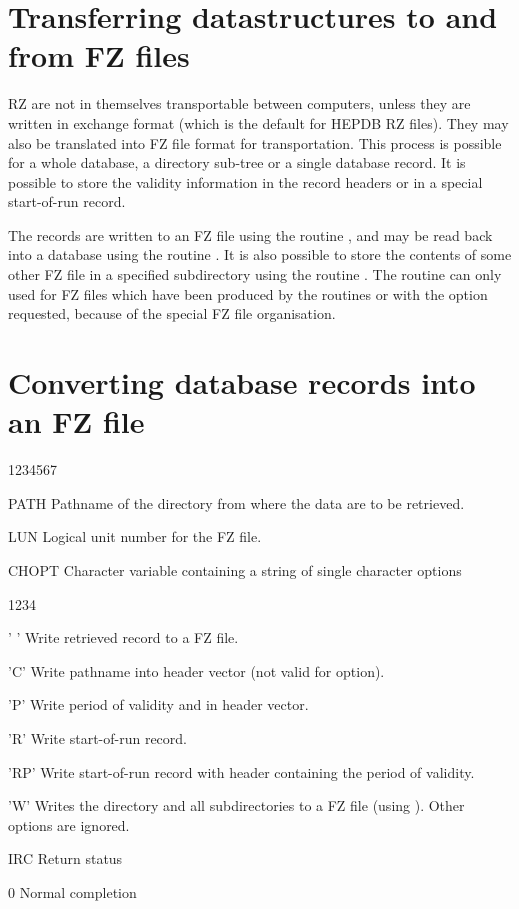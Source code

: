 \section{Transferring datastructures to and from FZ files}

RZ are not in themselves transportable between computers, unless
they are written in exchange format (which is the default for
HEPDB RZ files).
They may also be translated into FZ file format for
transportation. This process is possible for a whole database, a
directory sub-tree or a single database record. It is possible
to store the validity information in the record headers or in
a special start-of-run record.

The records are written to an FZ file using the routine , and
may be read back into a database using the routine . It is
also possible to store the contents of some other FZ file in a
specified subdirectory using the routine . The routine
 can only used for FZ files which have been produced by the
routines  or  with the option  requested,
because of the special FZ file organisation.

\section{Converting database records into an FZ file}


\begin{DLtt}{1234567}
\item[PATH]Pathname of the directory from where the data are
  to be retrieved.
\item[LUN]Logical unit number for the FZ file.
\item[CHOPT]Character variable containing a string of single character options
  \begin{DLtt}{1234}
    \item[' ']Write retrieved record to a FZ file.
    \item['C']Write pathname into header vector (not valid for
       option).
    \item['P']Write period of validity and  in header vector.
    \item['R']Write start-of-run record.
    \item['RP']Write start-of-run record with header containing
      the period of validity.
    \item['W']Writes the directory and all subdirectories to
      a FZ file (using ). Other options are ignored.
  \end{DLtt}
\item[IRC]Return status
  \begin{DLtt}{1}
    \item[0]Normal completion
  \end{DLtt}
\end{DLtt}

